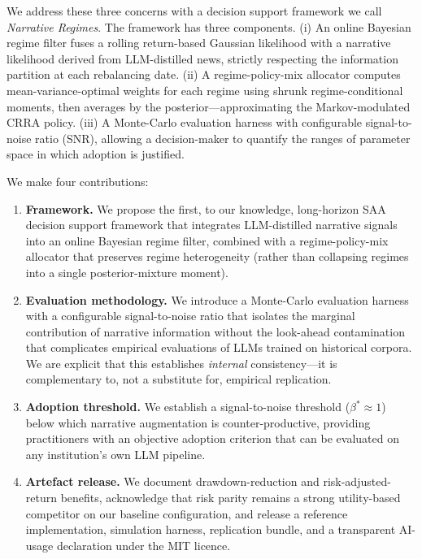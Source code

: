 \documentclass[review,12pt,authoryear]{elsarticle}
\begin{document}
We address these three concerns with a decision support framework we call
\emph{Narrative Regimes}. The framework has three components. (i) An online Bayesian regime
filter fuses a rolling return-based Gaussian likelihood with a narrative likelihood derived
from LLM-distilled news, strictly respecting the information partition at each rebalancing
date. (ii) A regime-policy-mix allocator computes mean-variance-optimal weights for each
regime using shrunk regime-conditional moments, then averages by the posterior---approximating
the Markov-modulated CRRA policy. (iii) A Monte-Carlo evaluation harness with configurable
signal-to-noise ratio (SNR), allowing a decision-maker to quantify the ranges of parameter
space in which adoption is justified.

We make four contributions:
\begin{enumerate}
    \item \textbf{Framework.} We propose the first, to our knowledge, long-horizon SAA decision
    support framework that integrates LLM-distilled narrative signals into an online Bayesian
    regime filter, combined with a regime-policy-mix allocator that preserves regime
    heterogeneity (rather than collapsing regimes into a single posterior-mixture moment).
    \item \textbf{Evaluation methodology.} We introduce a Monte-Carlo evaluation harness with
    a configurable signal-to-noise ratio that isolates the marginal contribution of narrative
    information without the look-ahead contamination that complicates empirical evaluations
    of LLMs trained on historical corpora. We are explicit that this establishes \emph{internal}
    consistency---it is complementary to, not a substitute for, empirical replication.
    \item \textbf{Adoption threshold.} We establish a signal-to-noise threshold
    ($\beta^{\ast}\!\approx 1$) below which narrative augmentation is counter-productive,
    providing practitioners with an objective adoption criterion that can be evaluated on
    any institution's own LLM pipeline.
    \item \textbf{Artefact release.} We document drawdown-reduction and risk-adjusted-return
    benefits, acknowledge that risk parity remains a strong utility-based competitor on our
    baseline configuration, and release a reference implementation, simulation harness,
    replication bundle, and a transparent AI-usage declaration under the MIT licence.
\end{enumerate}
\end{document}
